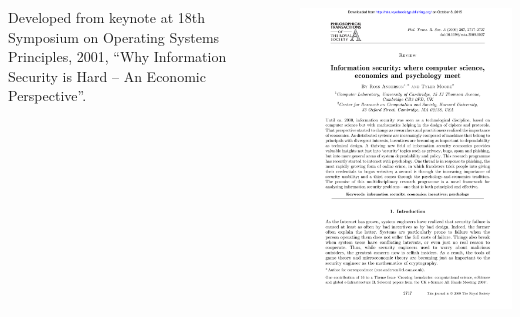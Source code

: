 \documentclass[handout, notes=hide]{beamer}
\begin{document}
\begin{frame}
\begin{columns}[b]
\begin{column}[c]{0.5\textwidth}
Developed from keynote at 18th Symposium on Operating Systems Principles, 2001, ``Why Information Security is Hard -- An Economic Perspective''.
\end{column}
\begin{column}[c]{0.48\textwidth}
\includegraphics[width=\textwidth, frame]{paperfront}
\end{column}
\end{columns}
\end{frame}

\end{document}
